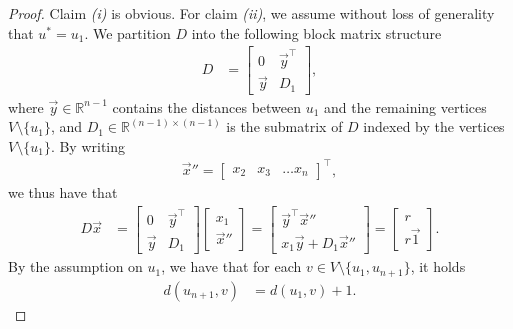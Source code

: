 \documentclass[11pt,a4paper]{article}
\newcommand{\distmatrix}{D}
\newcommand{\x}{\vec{x}}
\newcommand{\y}{\vec{y}}
\newcommand{\one}{\vec{1}}
\begin{document}
    \begin{proof}
        Claim \textit{(i)} is obvious. For claim \textit{(ii)}, we assume without loss of generality that $u^\ast = u_1$. We partition $\distmatrix$ into the following block matrix structure
            \begin{align*}
                \distmatrix &= \begin{bmatrix}
                    0 & \y^\top \\
                    \y  & \distmatrix_1
                \end{bmatrix},
            \end{align*}
        where $\y \in\mathbb{R}^{n-1}$ contains the distances between $u_1$ and the remaining vertices $V\setminus\{u_1\}$, and $\distmatrix_1\in\mathbb{R}^{(n-1)\times (n-1)}$ is the submatrix of $\distmatrix$ indexed by the vertices $V\setminus\{u_1\}$. By writing
            \begin{align*}
                {\x}'' = \begin{bmatrix}
                    x_2 & x_3 &\dotsc x_{n}
                \end{bmatrix}^\top,
            \end{align*}
        we thus have that
            \begin{align}\label{eq:dx}
                \distmatrix\x  &= \begin{bmatrix}
                    0 & \y^\top \\
                    \y  & \distmatrix_1
                \end{bmatrix}\begin{bmatrix}
                    x_1 \\ 
                    {\x}''
                \end{bmatrix} = \begin{bmatrix}
                    \y^\top {\x}'' \\
                    x_1 \y  + \distmatrix_1 {\x}''
                \end{bmatrix} = \begin{bmatrix}
                    r \\
                    r\one
                \end{bmatrix}.
            \end{align}
        By the assumption on $u_1$, we have that for each $v\in V\setminus\{u_1, u_{n+1}\}$, it holds
            \begin{align*}
                d(u_{n+1}, v) &= d(u_{1}, v) + 1.

\end{align*}
\end{proof}
\end{document}
